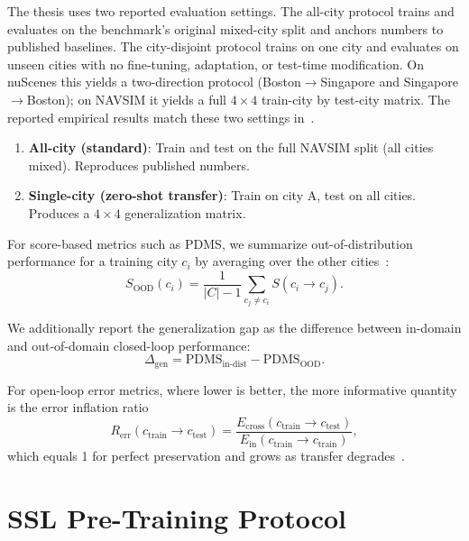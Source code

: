 The thesis uses two reported evaluation settings. The all-city protocol trains and evaluates on the benchmark's original mixed-city split and anchors numbers to published baselines. The city-disjoint protocol trains on one city and evaluates on unseen cities with no fine-tuning, adaptation, or test-time modification. On nuScenes this yields a two-direction protocol (Boston$\rightarrow$Singapore and Singapore$\rightarrow$Boston); on NAVSIM it yields a full $4 \times 4$ train-city by test-city matrix. The reported empirical results match these two settings in~\cite{naeinian-cross-city-2026}.
\begin{enumerate}
    \item \textbf{All-city (standard)}: Train and test on the full NAVSIM split (all cities mixed). Reproduces published numbers.
    \item \textbf{Single-city (zero-shot transfer)}: Train on city A, test on all cities. Produces a $4 \times 4$ generalization matrix.
\end{enumerate}

For score-based metrics such as PDMS, we summarize out-of-distribution performance for a training city $c_i$ by averaging over the other cities~\cite{naeinian-cross-city-2026}:
\begin{equation}
    S_\text{OOD}(c_i)=\frac{1}{|C|-1}\sum_{c_j \neq c_i} S(c_i \rightarrow c_j).
\end{equation}

We additionally report the generalization gap as the difference between in-domain and out-of-domain closed-loop performance:
\begin{equation}
    \Delta_\text{gen} = \text{PDMS}_\text{in-dist} - \text{PDMS}_\text{OOD}.
\end{equation}

For open-loop error metrics, where lower is better, the more informative quantity is the error inflation ratio
\begin{equation}
    R_\text{err}(c_\text{train}\rightarrow c_\text{test})=\frac{E_\text{cross}(c_\text{train}\rightarrow c_\text{test})}{E_\text{in}(c_\text{train}\rightarrow c_\text{train})},
\end{equation}
which equals 1 for perfect preservation and grows as transfer degrades~\cite{naeinian-cross-city-2026}.

\section{SSL Pre-Training Protocol}
\label{sec:meth-ssl-pretraining}

